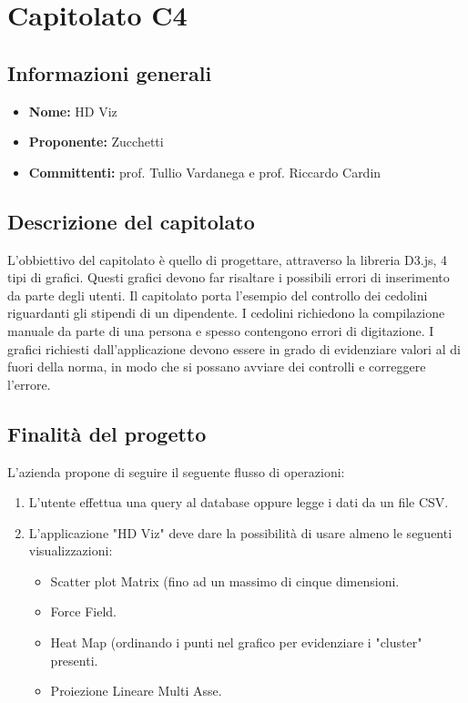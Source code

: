 \section{Capitolato C4}

\subsection{Informazioni generali}
\begin{itemize}
\item \textbf{Nome:} HD Viz
\item \textbf{Proponente:} Zucchetti
\item \textbf{Committenti:} prof. Tullio Vardanega e prof. Riccardo Cardin
\end{itemize}

\subsection{Descrizione del capitolato}
L'obbiettivo del capitolato è quello di progettare, attraverso la libreria D3.js, 4 tipi di grafici. Questi grafici devono far risaltare i possibili errori di inserimento da parte degli utenti.
Il capitolato porta l'esempio del controllo dei cedolini riguardanti gli stipendi di un dipendente. I cedolini richiedono la compilazione manuale da parte di una persona e spesso contengono errori di digitazione. I grafici richiesti dall'applicazione devono essere in grado di evidenziare valori al di fuori della norma, in modo che si possano avviare dei controlli e correggere l'errore.

\subsection{Finalità del progetto}
L'azienda propone di seguire il seguente flusso di operazioni:
\begin{enumerate}
\item L'utente effettua una query al database oppure legge i dati da un file CSV.
\item L'applicazione "HD Viz" deve dare la possibilità di usare almeno le seguenti visualizzazioni:
	\begin{itemize}
	\item Scatter plot Matrix (fino ad un massimo di cinque dimensioni.
	\item Force Field.
	\item Heat Map (ordinando i punti nel grafico per evidenziare i "cluster" presenti.
	\item Proiezione Lineare Multi Asse.
	\end{itemize}
\end{enumerate}

